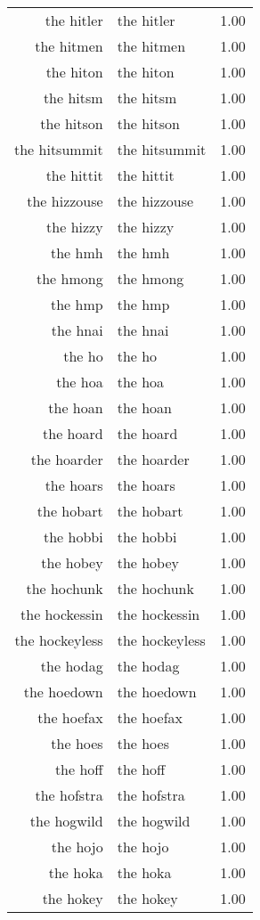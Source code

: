 \begin{table}[ht]
\begin{tabular}{rlr}
  the hitler & the hitler & 1.00 \\ 
  the hitmen & the hitmen & 1.00 \\ 
  the hiton & the hiton & 1.00 \\ 
  the hitsm & the hitsm & 1.00 \\ 
  the hitson & the hitson & 1.00 \\ 
  the hitsummit & the hitsummit & 1.00 \\ 
  the hittit & the hittit & 1.00 \\ 
  the hizzouse & the hizzouse & 1.00 \\ 
  the hizzy & the hizzy & 1.00 \\ 
  the hmh & the hmh & 1.00 \\ 
  the hmong & the hmong & 1.00 \\ 
  the hmp & the hmp & 1.00 \\ 
  the hnai & the hnai & 1.00 \\ 
  the ho & the ho & 1.00 \\ 
  the hoa & the hoa & 1.00 \\ 
  the hoan & the hoan & 1.00 \\ 
  the hoard & the hoard & 1.00 \\ 
  the hoarder & the hoarder & 1.00 \\ 
  the hoars & the hoars & 1.00 \\ 
  the hobart & the hobart & 1.00 \\ 
  the hobbi & the hobbi & 1.00 \\ 
  the hobey & the hobey & 1.00 \\ 
  the hochunk & the hochunk & 1.00 \\ 
  the hockessin & the hockessin & 1.00 \\ 
  the hockeyless & the hockeyless & 1.00 \\ 
  the hodag & the hodag & 1.00 \\ 
  the hoedown & the hoedown & 1.00 \\ 
  the hoefax & the hoefax & 1.00 \\ 
  the hoes & the hoes & 1.00 \\ 
  the hoff & the hoff & 1.00 \\ 
  the hofstra & the hofstra & 1.00 \\ 
  the hogwild & the hogwild & 1.00 \\ 
  the hojo & the hojo & 1.00 \\ 
  the hoka & the hoka & 1.00 \\ 
  the hokey & the hokey & 1.00 \\ 

\end{tabular}
\end{table}
